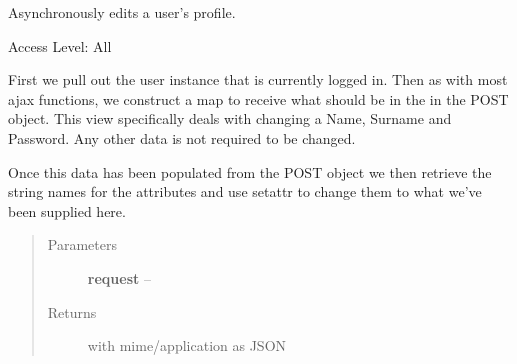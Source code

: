 \documentclass[letterpaper,10pt,english]{sphinxmanual}
\begin{document}

\begin{fulllineitems}
\label{timetracker:timetracker.utils.calendar_utils.profile_edit}
Asynchronously edits a user's profile.

Access Level: All

First we pull out the user instance that is currently logged in. Then as
with most ajax functions, we construct a map to receive what should be in
the in the POST object. This view specifically deals with changing a Name,
Surname and Password. Any other data is not required to be changed.

Once this data has been populated from the POST object we then retrieve
the string names for the attributes and use setattr to change them to what
we've been supplied here.
\begin{quote}\begin{description}
\item[{Parameters}] \leavevmode
\textbf{request} -- 

\item[{Returns}] \leavevmode
{} with mime/application as JSON

\end{description}\end{quote}

\end{fulllineitems}

\end{document}
